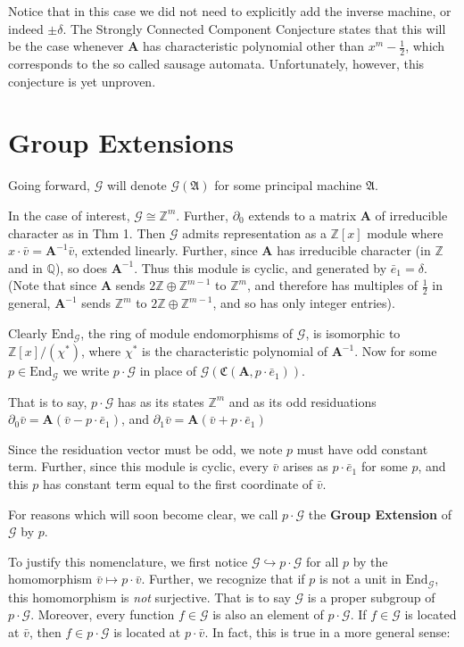 \documentclass[12pt]{article}
\newcommand{\G}{\mathcal{G}}
\renewcommand{\P}{\mathfrak{A}}
\newcommand{\Z}{\mathbb{Z}}
\newcommand{\Q}{\mathbb{Q}}
\newcommand{\2}{\textbf{2}}
\newcommand{\Am}{\textbf{A}}
\newcommand{\del}{\partial}
\renewcommand{\v}{\bar{v}}
\newcommand{\e}{\bar{e}}
\begin{document}
Notice that in this case we did not need to explicitly add the 
inverse machine, or indeed $\pm \delta$. The Strongly Connected Component
Conjecture states that this will be the case whenever $\Am$ has 
characteristic polynomial other than $x^m - \frac{1}{2}$, which corresponds
to the so called sausage automata. Unfortunately, however, 
this conjecture is yet unproven.

\section{Group Extensions}
Going forward, $\G$ will denote $\G(\P)$ for some principal machine $\P$.

In the case of interest, $\G \cong \Z^m$. Further, $\del_0$ extends to 
a matrix $\Am$ of irreducible character as in Thm 1. Then
$\G$ admits representation as a $\Z[x]$ module where 
$x \cdot \v = \Am^{-1}\v$, extended linearly.
Further, since $\Am$ has irreducible character (in $\Z$ and in $\Q$), 
so does $\Am^{-1}$. Thus this module is cyclic, 
and generated by $\e_1 = \delta$. 
(Note that since $\Am$ sends $2\Z \oplus \Z^{m-1}$ to $\Z^m$, and therefore
has multiples of $\frac{1}{2}$ in general, $\Am^{-1}$ sends $\Z^m$ to 
$2\Z \oplus \Z^{m-1}$, and so has only integer entries).

Clearly $\text{End}_{\G}$, the ring of module endomorphisms of $\G$, 
is isomorphic to $\Z[x]/(\chi^*)$, 
where $\chi^*$ is the characteristic polynomial of $\Am^{-1}$.
Now for some $p \in \text{End}_{\G}$ we write
$p \cdot \G$ in place of $\G(\mathfrak{C}(\Am,p \cdot \e_1))$.

That is to say, $p \cdot \G$ has as its states $\Z^m$ and as its 
odd residuations
$\del_0 \v = \Am (\v - p \cdot \e_1)$, and 
$\del_1 \v = \Am (\v + p \cdot \e_1)$

Since the residuation vector must be odd, we note $p$ must have odd
constant term. Further, since this module is cyclic, every $\v$ arises
as $p \cdot \e_1$ for some $p$, and this $p$ has constant term equal to
the first coordinate of $\v$.

For reasons which will soon become clear, we call $p \cdot \G$ the
\textbf{Group Extension} of $\G$ by $p$.

To justify this nomenclature, we first notice 
$\G \hookrightarrow p \cdot \G$ for all $p$ by the
homomorphism $\v \mapsto p \cdot \v$. 
Further, we recognize that if $p$ is not a unit in $\text{End}_{\G}$, 
this homomorphism is \emph{not} surjective. 
That is to say $\G$ is a proper subgroup of $p \cdot \G$.
Moreover, every function $f \in \G$ is also an element of $p \cdot \G$. 
If $f \in \G$ is located at $\v$, then $f \in p \cdot \G$ is located
at $p \cdot \v$. In fact, this is true in a more general sense:
\end{document}
